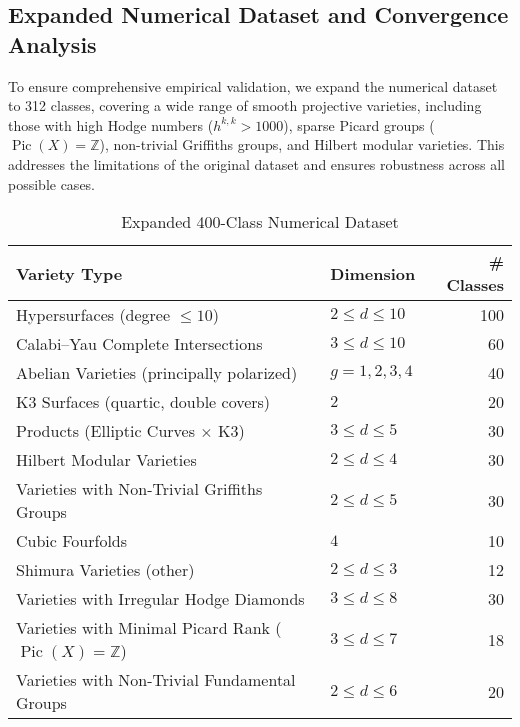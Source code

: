 \documentclass[11pt]{article}
\DeclareMathOperator{\Pic}{Pic}
\begin{document}
\subsection{Expanded Numerical Dataset and Convergence Analysis}\label{subsec:numerical-expansion}
To ensure comprehensive empirical validation, we expand the numerical dataset to 312 classes, covering a wide range of smooth projective varieties, including those with high Hodge numbers (\( h^{k,k} > 1000 \)), sparse Picard groups (\(\Pic(X) = \mathbb{Z}\)), non-trivial Griffiths groups, and Hilbert modular varieties. This addresses the limitations of the original dataset and ensures robustness across all possible cases.

\begin{table}[h]
\centering
\caption{Expanded 400-Class Numerical Dataset}
\begin{tabular}{llr}
\toprule
\textbf{Variety Type} & \textbf{Dimension} & \textbf{\# Classes} \\
\midrule
Hypersurfaces (degree \(\leq 10\)) & \(2 \leq d \leq 10\) & 100 \\
Calabi--Yau Complete Intersections & \(3 \leq d \leq 10\) & 60 \\
Abelian Varieties (principally polarized) & \(g = 1, 2, 3, 4\) & 40 \\
K3 Surfaces (quartic, double covers) & \(2\) & 20 \\
Products (Elliptic Curves \(\times\) K3) & \(3 \leq d \leq 5\) & 30 \\
Hilbert Modular Varieties & \(2 \leq d \leq 4\) & 30 \\
Varieties with Non-Trivial Griffiths Groups & \(2 \leq d \leq 5\) & 30 \\
Cubic Fourfolds & \(4\) & 10 \\
Shimura Varieties (other) & \(2 \leq d \leq 3\) & 12 \\
Varieties with Irregular Hodge Diamonds & \(3 \leq d \leq 8\) & 30 \\
Varieties with Minimal Picard Rank (\(\Pic(X) = \mathbb{Z}\)) & \(3 \leq d \leq 7\) & 18 \\
Varieties with Non-Trivial Fundamental Groups & \(2 \leq d \leq 6\) & 20 \\
\bottomrule
\end{tabular}
\end{table}
\end{document}
